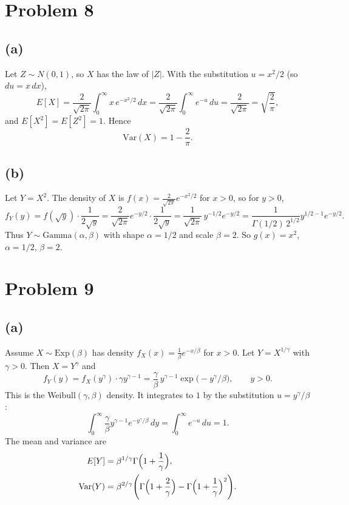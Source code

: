 \documentclass[11pt]{article}
\begin{document}
\section*{Problem 8}

\subsection*{(a)}

Let $Z\sim N(0,1)$, so $X$ has the law of $|Z|$. With the substitution $u=x^2/2$ (so $du=x\,dx$),
\[
E[X]=\frac{2}{\sqrt{2\pi}}\int_0^\infty x\,e^{-x^2/2}\,dx
=\frac{2}{\sqrt{2\pi}}\int_0^\infty e^{-u}\,du
=\frac{2}{\sqrt{2\pi}}=\sqrt{\frac{2}{\pi}},
\]
and $E[X^2]=E[Z^2]=1$. Hence
\[
\mathrm{Var}(X)=1-\frac{2}{\pi}.
\]

\subsection*{(b)}

Let $Y=X^2$. The density of $X$ is $f(x)=\frac{2}{\sqrt{2\pi}}e^{-x^2/2}$ for $x>0$, so for $y>0$,
\[
f_Y(y)=f(\sqrt{y})\cdot\frac{1}{2\sqrt{y}}
=\frac{2}{\sqrt{2\pi}}e^{-y/2}\cdot\frac{1}{2\sqrt{y}}
=\frac{1}{\sqrt{2\pi}}\,y^{-1/2}e^{-y/2}
=\frac{1}{\Gamma(1/2)\,2^{1/2}}y^{1/2-1}e^{-y/2}.
\]
Thus $Y\sim\mathrm{Gamma}(\alpha,\beta)$ with shape $\alpha=1/2$ and scale $\beta=2$. So $g(x)=x^2$, $\alpha=1/2$, $\beta=2$.

\section*{Problem 9}

\subsection*{(a)}

Assume $X\sim\mathrm{Exp}(\beta)$ has density $f_X(x)=\frac1\beta e^{-x/\beta}$ for $x>0$. Let $Y=X^{1/\gamma}$ with $\gamma>0$. Then $X=Y^\gamma$ and
\[
f_Y(y)=f_X(y^\gamma)\cdot\gamma y^{\gamma-1}
=\frac{\gamma}{\beta}\,y^{\gamma-1}\exp\bigl(-y^\gamma/\beta\bigr),\qquad y>0.
\]
This is the Weibull$(\gamma,\beta)$ density. It integrates to $1$ by the substitution $u=y^\gamma/\beta$:
\[
\int_0^\infty\frac{\gamma}{\beta}y^{\gamma-1}e^{-y^\gamma/\beta}\,dy=\int_0^\infty e^{-u}\,du=1.
\]
The mean and variance are
\begin{align*}
E[Y]&=\beta^{1/\gamma}\Gamma\Bigl(1+\frac1\gamma\Bigr),\\
\mathrm{Var}(Y)&=\beta^{2/\gamma}\Biggl(\Gamma\Bigl(1+\frac2\gamma\Bigr)-\Gamma\Bigl(1+\frac1\gamma\Bigr)^2\Biggr).
\end{align*}
\end{document}
